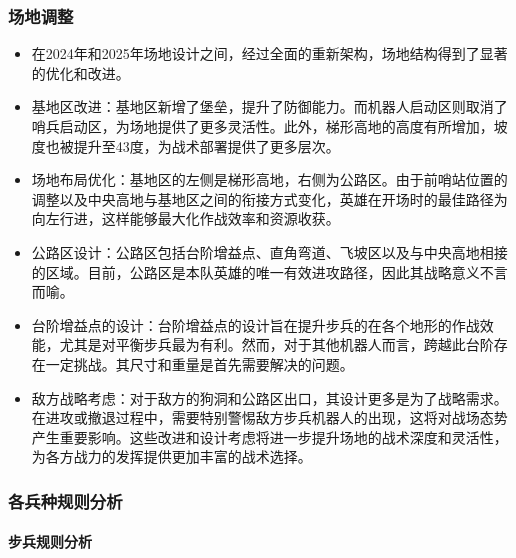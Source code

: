     \subsubsection{场地调整}


        \begin{itemize}
            \item 在2024年和2025年场地设计之间，经过全面的重新架构，场地结构得到了显著的优化和改进。
            \item 基地区改进：基地区新增了堡垒，提升了防御能力。而机器人启动区则取消了哨兵启动区，为场地提供了更多灵活性。此外，梯形高地的高度有所增加，坡度也被提升至43度，为战术部署提供了更多层次。
            \item 场地布局优化：基地区的左侧是梯形高地，右侧为公路区。由于前哨站位置的调整以及中央高地与基地区之间的衔接方式变化，英雄在开场时的最佳路径为向左行进，这样能够最大化作战效率和资源收获。
            \item 公路区设计：公路区包括台阶增益点、直角弯道、飞坡区以及与中央高地相接的区域。目前，公路区是本队英雄的唯一有效进攻路径，因此其战略意义不言而喻。
            \item 台阶增益点的设计：台阶增益点的设计旨在提升步兵的在各个地形的作战效能，尤其是对平衡步兵最为有利。然而，对于其他机器人而言，跨越此台阶存在一定挑战。其尺寸和重量是首先需要解决的问题。
            \item 敌方战略考虑：对于敌方的狗洞和公路区出口，其设计更多是为了战略需求。在进攻或撤退过程中，需要特别警惕敌方步兵机器人的出现，这将对战场态势产生重要影响。这些改进和设计考虑将进一步提升场地的战术深度和灵活性，为各方战力的发挥提供更加丰富的战术选择。
        \end{itemize}

    \subsubsection{各兵种规则分析}

        \paragraph{步兵规则分析}

    
